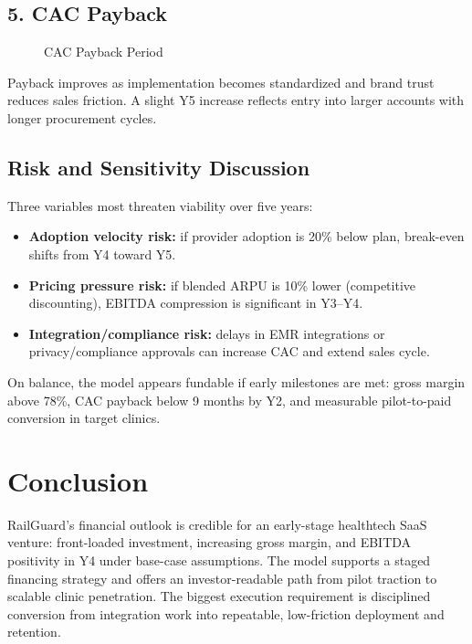 \documentclass[11pt]{article}
\begin{document}
\subsection*{5. CAC Payback}
\begin{figure}[h]
\centering
{}
\caption{CAC Payback Period}
\end{figure}

Payback improves as implementation becomes standardized and brand trust reduces sales friction. A slight Y5 increase reflects entry into larger accounts with longer procurement cycles.

\subsection*{Risk and Sensitivity Discussion}
Three variables most threaten viability over five years:
\begin{itemize}
\item \textbf{Adoption velocity risk:} if provider adoption is 20\% below plan, break-even shifts from Y4 toward Y5.
\item \textbf{Pricing pressure risk:} if blended ARPU is 10\% lower (competitive discounting), EBITDA compression is significant in Y3--Y4.
\item \textbf{Integration/compliance risk:} delays in EMR integrations or privacy/compliance approvals can increase CAC and extend sales cycle.
\end{itemize}
On balance, the model appears fundable if early milestones are met: gross margin above 78\%, CAC payback below 9 months by Y2, and measurable pilot-to-paid conversion in target clinics.

\section*{Conclusion}
RailGuard's financial outlook is credible for an early-stage healthtech SaaS venture: front-loaded investment, increasing gross margin, and EBITDA positivity in Y4 under base-case assumptions. The model supports a staged financing strategy and offers an investor-readable path from pilot traction to scalable clinic penetration. The biggest execution requirement is disciplined conversion from integration work into repeatable, low-friction deployment and retention.
\end{document}
